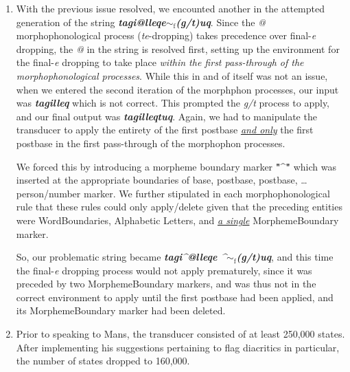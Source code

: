 \documentclass{article}
\begin{document}
\begin{enumerate}
\item With the previous issue resolved, we encounted another in the attempted generation of the string \textit{\textbf{tagi@lleqe${\sim}_\text{f}$(g/t)uq}}. Since the \textit{@} morphophonological process (\textit{te}-dropping) takes precedence over final-\textit{e} dropping, the \textit{@} in the string is resolved first, setting up the environment for the final-\textit{e} dropping to take place \textit{within the first pass-through of the morphophonological processes}. While this in and of itself was not an issue, when we entered the second iteration of the morphphon processes, our input was \textit{\textbf{tagilleq}} which is not correct. This prompted the \textit{g/t} process to apply, and our final output was \textit{\textbf{tagilleqtuq}}. Again, we had to manipulate the transducer to apply the entirety of the first postbase \textit{\uline{and only}} the first postbase in the first pass-through of the morphophon processes.

We forced this by introducing a morpheme boundary marker \textbf{"\textasciicircum"} which was inserted at the appropriate boundaries of base, postbase, postbase, \ldots person/number marker. We further stipulated in each morphophonological rule that these rules could only apply/delete given that the preceding entities were WordBoundaries, Alphabetic Letters, and \textit{\uline{a single}} MorphemeBoundary marker.

So, our problematic string became \textit{\textbf{tagi\textasciicircum @lleqe \textasciicircum ${\sim}_\text{f}$(g/t)uq}}, and this time the final-\textit{e} dropping process would not apply prematurely, since it was preceded by two MorphemeBoundary markers, and was thus not in the correct environment to apply until the first postbase had been applied, and its MorphemeBoundary marker had been deleted.

\item Prior to speaking to Mans, the transducer consisted of at least 250,000 states.
%
After implementing his suggestions pertaining to flag diacritics in particular, the number of states dropped to 160,000.

\end{enumerate}
\end{document}
